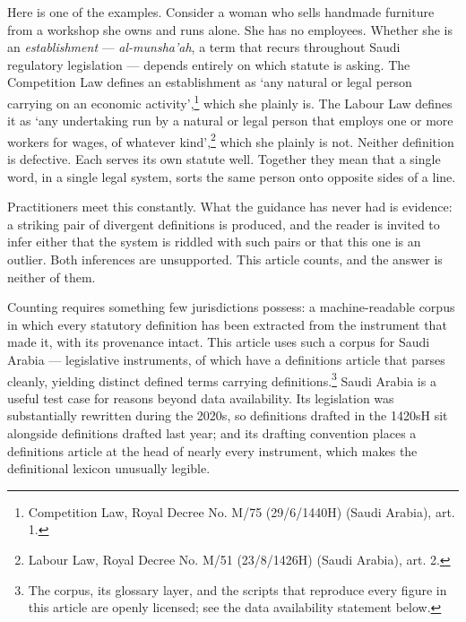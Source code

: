 \documentclass[11pt]{article}
\newif\ifanon
\begin{document}
Here is one of the examples. Consider a woman who sells handmade furniture
from a workshop she owns and runs alone. She has no employees. Whether she is
an \emph{establishment}
--- \emph{al-munsha'ah}, a term that recurs throughout Saudi regulatory
legislation --- depends entirely on which statute is asking. The Competition
Law defines an establishment as `any natural or legal person carrying on an
economic activity',\footnote{Competition Law, Royal Decree No. M/75 (29/6/1440H) (Saudi Arabia), art. 1.} which she plainly is. The Labour Law defines it as `any undertaking
run by a natural or legal person that employs one or more workers for wages,
of whatever kind',\footnote{Labour Law, Royal Decree No. M/51 (23/8/1426H) (Saudi Arabia), art. 2.} which she plainly is not. Neither definition is defective. Each serves
its own statute well. Together they mean that a single word, in a single
legal system, sorts the same person onto opposite sides of a line.

Practitioners meet this constantly. What the guidance has never had is
evidence: a striking pair of divergent definitions is produced, and the reader
is invited to infer either that the system is riddled with such pairs or that
this one is an outlier. Both inferences are unsupported. This article counts,
and the answer is neither of them.

Counting requires something few jurisdictions possess: a machine-readable
corpus in which every statutory definition has been extracted from the
instrument that made it, with its provenance intact. This article uses such a
corpus for Saudi Arabia --- \nInstruments{} legislative instruments, of which
\nWithDefsArticle{} have a definitions article that parses cleanly, yielding
\nTerms{} distinct defined terms carrying \nDefinitions{} definitions.\footnote{The corpus, its glossary layer,
and the scripts that reproduce every figure in this article are openly
licensed; \ifanon the repository is named in the data availability statement
supplied with this submission, which is withheld from the anonymised text
because its address identifies the author\else see the data availability
statement below\fi.} Saudi Arabia is a
useful test case for reasons beyond data availability. Its legislation was
substantially rewritten during the 2020s, so definitions drafted in the
1420sH sit alongside definitions drafted last year; and its drafting
convention places a definitions article at the head of nearly every
instrument, which makes the definitional lexicon unusually legible.
\end{document}
